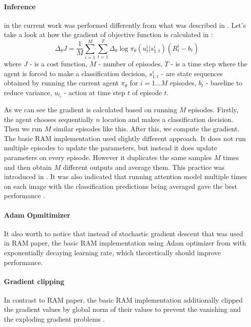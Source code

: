 \paragraph{Inference} in the current work was performed differently from what was
described in \cite{DBLP:journals/corr/MnihHGK14}.
Let's take a look at how the gradient of objective function is calculated in \cite{DBLP:journals/corr/MnihHGK14}:
\begin{equation} \label{eq:}
	\Delta_{\theta} J = \frac{1}{M} \sum_{i=1}^M \sum_{t=1}^T
		\Delta_{\theta} \log \pi_{\theta}(u_t^i| s_{1:t}^i) (R_t^i - b_t)
\end{equation}
where $J$ - is a cost function, $M$ - number of episodes,
$T$ - is a time step where the agent is forced to make a classification decision,
$s_{1:t}^i$ - are state sequences obtained by
running the current agent $\pi_{\theta}$ for $i = 1 . . .M$ episodes,
$b_t$ - baseline to reduce variance, $u_t_i$ - action at time step $t$
of episode $t$.

As we can see the gradient is calculated based on running $M$ episodes.
Firstly, the agent chooses sequentially $n$ location and makes a classification
decision. Then we run $M$ similar episodes like this. After this,
we compute the gradient. The basic RAM implementation used slightly different
approach. It does not run multiple episodes to update the parameters, but instead
it does update parameters on every episode. However it duplicates the same
samples $M$ times and then obtain $M$ different outputs and average them.
This practice was introduced in \cite{DBLP:journals/corr/BaMK14}.
It was also indicated that running attention model multiple times on each
image with the classification predictions being averaged gave the best
performance \cite{DBLP:journals/corr/BaMK14}.


\paragraph{Adam Opmitimizer} It also worth to notice that instead of stochastic
gradient descent that was used in RAM paper, the basic RAM implementation using Adam optimizer
from \cite{DBLP:journals/corr/KingmaB14} with exponentially decaying learning rate,
which theoretically should improve performance. \cite{DBLP:journals/corr/KingmaB14}


\paragraph{Gradient clipping} In contrast to RAM paper, the basic RAM implementation
additionally clipped the gradient values by global norm of their values to prevent the vanishing
and the exploding gradient problems \cite{Pascanu2012}.


